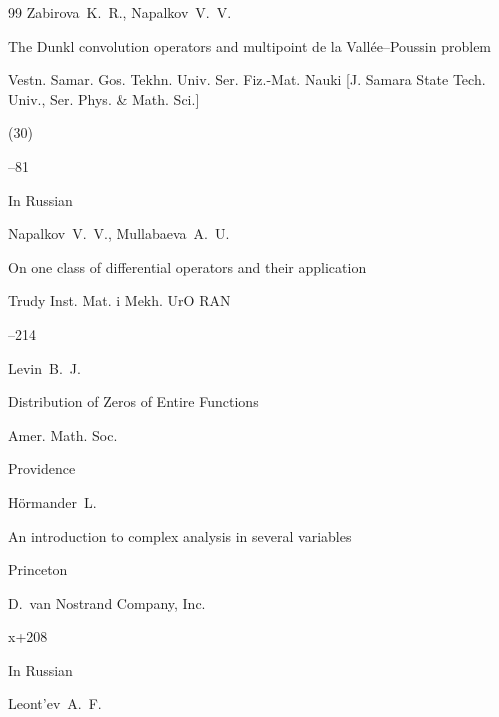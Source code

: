 \begin{thebibliography}{99}
\by Zabirova~K.~R., Napalkov~V.~V.

\paper The Dunkl convolution operators and multipoint de la Vall\'ee--Poussin problem

\jour Vestn. Samar. Gos. Tekhn. Univ. Ser. Fiz.-Mat. Nauki \rm [J. Samara State Tech. Univ., Ser. Phys. \& Math. Sci.]


(30)

--81







\lang In Russian

\by Napalkov~V.~V., Mullabaeva~A.~U.

\paper On one class of differential operators and their application

\serial Trudy Inst. Mat. i Mekh. UrO RAN




--214






\by  Levin~B.~J.

\book Distribution of Zeros of Entire Functions

\publ Amer. Math. Soc.

\publaddr Providence



 


\by H\"ormander~L.

\book An introduction to complex analysis in several variables

\publaddr Princeton

\publ D.~van Nostrand Company, Inc. 

\totalpages x+208 






\lang In Russian

\by Leont'ev~A.~F.


\end{thebibliography}
